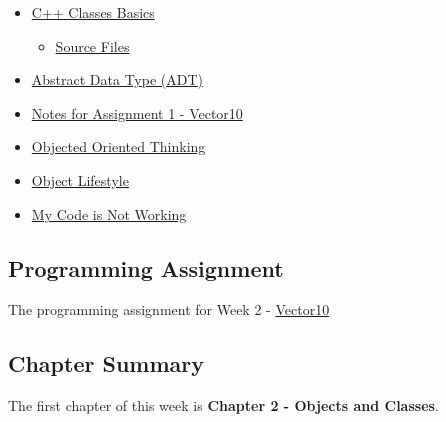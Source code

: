 \begin{itemize}
    \item \href{https://www.youtube.com/watch?v=5O2duDg0XGk}{C++ Classes Basics}
    \begin{itemize}
        \item \href{https://applied.cs.colorado.edu/mod/folder/view.php?id=45873}{Source Files}
    \end{itemize}
    \item \href{https://www.youtube.com/watch?v=AwnhJZeIM-A}{Abstract Data Type (ADT)}
    \item \href{https://www.youtube.com/watch?v=YkY2-O2ByuA}{Notes for Assignment 1 - Vector10}
    \item \href{https://applied.cs.colorado.edu/mod/hvp/view.php?id=45877}{Objected Oriented Thinking}
    \item \href{https://applied.cs.colorado.edu/mod/hvp/view.php?id=45878}{Object Lifestyle}
    \item \href{https://www.youtube.com/watch?v=uwLNltNof0A}{My Code is Not Working}
\end{itemize}

\subsection{Programming Assignment}

The programming assignment for Week 2 - \href{https://github.com/QuantumCompiler/CU/tree/main/CSPB%202270%20-%20Data%20Structures/CSPB%202270%20-%20Programming%20Assignments/CSPB%202270%20-%20Assignment%201%20-%20Vector10}{Vector10}

\subsection{Chapter Summary}

The first chapter of this week is \textbf{Chapter 2 - Objects and Classes}.

